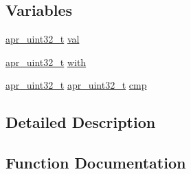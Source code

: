 \subsection*{Variables}
\begin{DoxyCompactItemize}
\item 
\hyperlink{group__apr__platform_ga558548a135d8a816c4787250744ea147}{apr\+\_\+uint32\+\_\+t} \hyperlink{group__apr__atomic_ga3417a7362df60235739309b39556b804}{val}
\item 
\hyperlink{group__apr__platform_ga558548a135d8a816c4787250744ea147}{apr\+\_\+uint32\+\_\+t} \hyperlink{group__apr__atomic_ga62bdcea60b77e638d3d88947a34aff05}{with}
\item 
\hyperlink{group__apr__platform_ga558548a135d8a816c4787250744ea147}{apr\+\_\+uint32\+\_\+t} \hyperlink{group__apr__platform_ga558548a135d8a816c4787250744ea147}{apr\+\_\+uint32\+\_\+t} \hyperlink{group__apr__atomic_ga337f72af8c74a9110f79160df3bba5e8}{cmp}
\end{DoxyCompactItemize}


\subsection{Detailed Description}


\subsection{Function Documentation}
